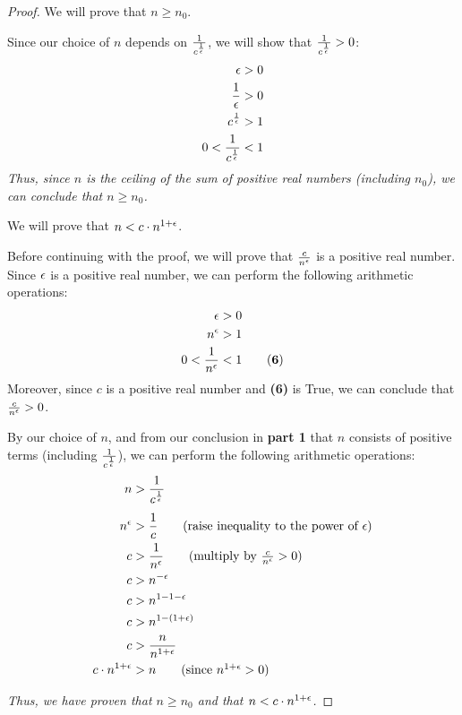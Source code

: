 \documentclass[12pt]{article}
\theoremstyle{definition}
\begin{document}
\begin{enumerate}
\begin{proof}
             We will prove that $n \geq n_0$.
            
            Since our choice of $n$ depends on $\frac{1}{c^{\frac{1}{\epsilon}}}$, we will show that $\frac{1}{c^{\frac{1}{\epsilon}}} > 0$:
            \begin{align*}
                \epsilon &> 0\\
                \frac{1}{\epsilon} &> 0\\
                c^{\frac{1}{\epsilon}} &> 1\\
                0 < \frac{1}{c^{\frac{1}{\epsilon}}} &< 1
            \end{align*}
            \emph{Thus, since $n$ is the ceiling of the sum of positive real numbers (including $n_0$), we can conclude that $n \geq n_0$.}
            
            \newpage
            
             We will prove that $n < c \cdot n^{1 + \epsilon}$.
            
            Before continuing with the proof, we will prove that $\frac{c}{n^\epsilon}$ is a positive real number. Since $\epsilon$ is a positive real number, we can perform the following arithmetic operations:
            \begin{align*}
                \e &> 0\\
                n^\e &> 1\\
                0 < \frac{1}{n^\e} &< 1 \tag{\textbf{6}}
            \end{align*}
            Moreover, since $c$ is a positive real number and \textbf{(6)} is True, we can conclude that $\frac{c}{n^\epsilon} > 0$.
            
            By our choice of $n$, and from our conclusion in \textbf{part 1} that $n$ consists of positive terms \big(including $\frac{1}{c^{\frac{1}{\epsilon}}}$\big), we can perform the following arithmetic operations:
            \begin{align*}
                n &> \bb\\[1ex]
                n^\e &> \frac{1}{c} \tag{raise inequality to the power of $\e$}\\
                c &> \frac{1}{n^\e} \tag{multiply by $\frac{c}{n^\e} > 0$}\\
                c &> n^{-\e} \\
                c &> n^{1 - 1 - \e}\\
                c &> n^{1 - (1 + \e)}\\
                c &> \frac{n}{n^{1 + \e}}\\
                c \cdot n^{1 + \e} &> n \tag{since $n^{1 + \e} > 0$}\\
            \end{align*}
            
            \emph{Thus, we have proven that $n \geq n_0$ and that $n < c \cdot n^{1 + \epsilon}$.}
        \end{proof}
        
\end{enumerate}
\end{document}
